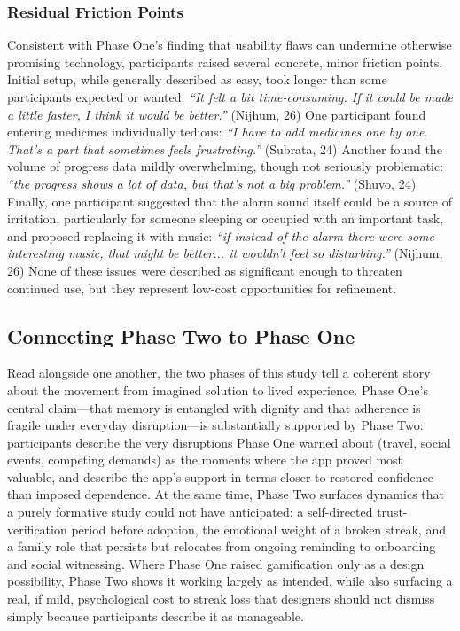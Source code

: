 \documentclass[acmlarge]{acmart}
\begin{document}
\subsubsection{Residual Friction Points}
Consistent with Phase One's finding that usability flaws can undermine
otherwise promising technology, participants raised several concrete, minor
friction points. Initial setup, while generally described as easy, took
longer than some participants expected or wanted: \emph{``It felt a bit
time-consuming. If it could be made a little faster, I think it would be
better.''} (Nijhum, 26) One participant found entering medicines
individually tedious: \emph{``I have to add medicines one by one. That's a
part that sometimes feels frustrating.''} (Subrata, 24) Another found the
volume of progress data mildly overwhelming, though not seriously
problematic: \emph{``the progress shows a lot of data, but that's not a big
problem.''} (Shuvo, 24) Finally, one participant suggested that the alarm
sound itself could be a source of irritation, particularly for someone
sleeping or occupied with an important task, and proposed replacing it with
music: \emph{``if instead of the alarm there were some interesting music,
that might be better... it wouldn't feel so disturbing.''} (Nijhum, 26)
None of these issues were described as significant enough to threaten
continued use, but they represent low-cost opportunities for refinement.

\subsection{Connecting Phase Two to Phase One}
Read alongside one another, the two phases of this study tell a coherent
story about the movement from imagined solution to lived experience.
Phase One's central claim---that memory is entangled with dignity and that
adherence is fragile under everyday disruption---is substantially supported
by Phase Two: participants describe the very disruptions Phase One warned
about (travel, social events, competing demands) as the moments where the
app proved most valuable, and describe the app's support in terms closer to
restored confidence than imposed dependence. At the same time, Phase Two
surfaces dynamics that a purely formative study could not have
anticipated: a self-directed trust-verification period before adoption,
the emotional weight of a broken streak, and a family role that persists
but relocates from ongoing reminding to onboarding and social witnessing.
Where Phase One raised gamification only as a design possibility, Phase Two
shows it working largely as intended, while also surfacing a real, if mild,
psychological cost to streak loss that designers should not dismiss simply
because participants describe it as manageable.
\end{document}
